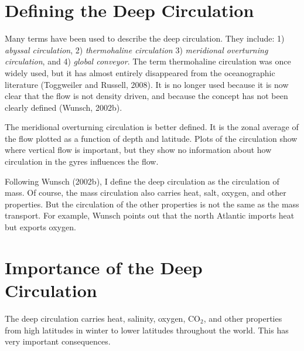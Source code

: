 \section{Defining the Deep Circulation}
Many terms have been used to describe the deep circulation. They
include:
1) \textit{abyssal circulation},
2) \textit{thermohaline circulation}
3) \textit{meridional overturning
  circulation}, and
4) \textit{global conveyor}.
The term thermohaline circulation was once widely used, but it has
almost entirely disappeared from the oceanographic literature
(Toggweiler and Russell, 2008). It is no longer used because it is now
clear that the flow is not density driven, and because the concept has
not been clearly defined (Wunsch, 2002b).

The meridional overturning circulation is better defined. It is the
zonal average of the flow plotted as a function of depth and
latitude. Plots of the circulation show where vertical flow is
important, but they show no information about how circulation in the
gyres influences the flow.

Following Wunsch (2002b), I define the deep circulation as the
circulation of mass. Of course, the mass circulation also carries
heat, salt, oxygen, and other properties. But the circulation of the
other properties is not the same as the mass
transport. For example, Wunsch points out that
the north Atlantic imports heat but exports oxygen.
 
\section{Importance of the Deep Circulation}
The deep circulation carries heat,
salinity, oxygen, CO$_2$, and other properties from high latitudes in
winter to lower latitudes throughout the world. This has very
important consequences.

